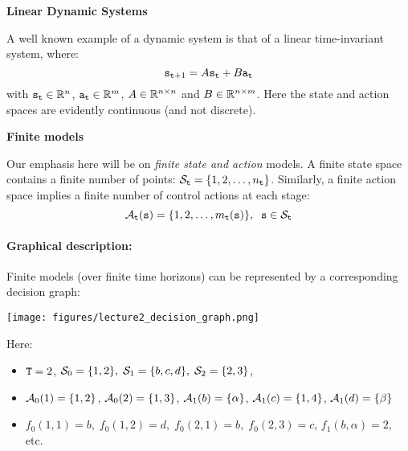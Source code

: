 \begin{example}{\textbf{Linear Dynamic Systems}}

A well known example of a dynamic system is that of a linear
time-invariant system, where:
\[{{\tt s}_{{\tt t} + 1}} = A{{\tt s}_{{\tt t}}} + B{{\tt a}_{{\tt t}}}\]
with ${{\tt s}_{{\tt t}}} \in \mathbb{R}^n$, ${\tt a}_{{\tt t}} \in \mathbb{R}^m$,
$A\in\mathbb{R}^{n\times n}$ and $B\in\mathbb{R}^{n\times m}$. Here the state and
action spaces are evidently continuous (and not discrete).
\end{example}

\begin{example}{\textbf{Finite models}}

Our emphasis here will be on \emph{finite state and action} models.
A finite state space contains a finite number of points:
${\mathcal{S}_{{\tt t}}} = \{ 1,2, \ldots ,{n_{{\tt t}}}\} $. Similarly, a
finite action space implies a finite number of control actions at
each stage:
\[{\mathcal{A}_{{\tt t}}}({\tt s}) = \{ 1,2, \ldots ,{m_{{\tt t}}}({\tt s})\} ,\;\;{\tt s} \in {\mathcal{S}_{{\tt t}}}\]
\end{example}



\paragraph{Graphical description:} Finite models (over finite time horizons) can be represented by a corresponding decision graph:

\begin{centering}
\texttt{[image: figures/lecture2\_decision\_graph.png]}\\
\end{centering}

Here:
\begin{itemize}
  \item ${\tt T} = 2$, ${\mathcal{S}_0} = \{ 1,2\} ,\;{\mathcal{S}_1} = \{ b,c,d\} ,\;{\mathcal{S}_2} = \{ 2,3\} $,
  \item ${\mathcal{A}_0}(1) = \{ 1,2\} $, ${\mathcal{A}_0}(2) = \{ 1,3\} $, ${\mathcal{A}_1}(b) = \{ \alpha \} $, ${\mathcal{A}_1}(c) = \{ 1,4\} $, ${\mathcal{A}_1}(d) = \{ \beta \} $
  \item ${f_0}(1,1) = b,\;{f_0}(1,2) = d,\;{f_0}(2,1) = b,\;{f_0}(2,3) = c$, ${f_1}(b,\alpha ) = 2$, etc.
\end{itemize}

